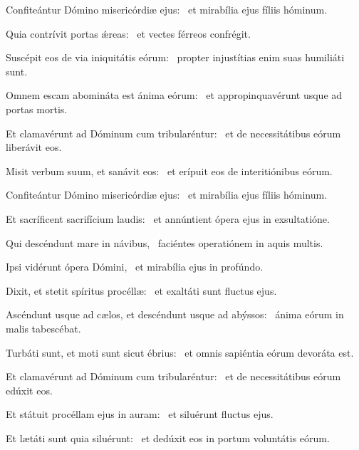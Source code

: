 
\item Confiteántur Dómino misericórdiæ ejus:~\psstar{} et mirabília ejus fíliis hóminum.

\item Quia contrívit portas ǽreas:~\psstar{} et vectes férreos confrégit.

\item Suscépit eos de via iniquitátis eórum:~\psstar{} propter injustítias enim suas humiliáti sunt.

\item Omnem escam abomináta est ánima eórum:~\psstar{} et appropinquavérunt usque ad portas mortis.

\item Et clamavérunt ad Dóminum cum tribularéntur:~\psstar{} et de necessitátibus eórum liberávit eos.

\item Misit verbum suum, et sanávit eos:~\psstar{} et erípuit eos de interitiónibus eórum.

\item Confiteántur Dómino misericórdiæ ejus:~\psstar{} et mirabília ejus fíliis hóminum.

\item Et sacríficent sacrifícium laudis:~\psstar{} et annúntient ópera ejus in exsultatióne.

\item Qui descéndunt mare in návibus,~\psstar{} faciéntes operatiónem in aquis multis.

\item Ipsi vidérunt ópera Dómini,~\psstar{} et mirabília ejus in profúndo.

\item Dixit, et stetit spíritus procéllæ:~\psstar{} et exaltáti sunt fluctus ejus.

\item Ascéndunt usque ad cælos, et descéndunt usque ad abýssos:~\psstar{} ánima eórum in malis tabescébat.

\item Turbáti sunt, et moti sunt sicut ébrius:~\psstar{} et omnis sapiéntia eórum devoráta est.

\item Et clamavérunt ad Dóminum cum tribularéntur:~\psstar{} et de necessitátibus eórum edúxit eos.

\item Et státuit procéllam ejus in auram:~\psstar{} et siluérunt fluctus ejus.

\item Et lætáti sunt quia siluérunt:~\psstar{} et dedúxit eos in portum voluntátis eórum.
